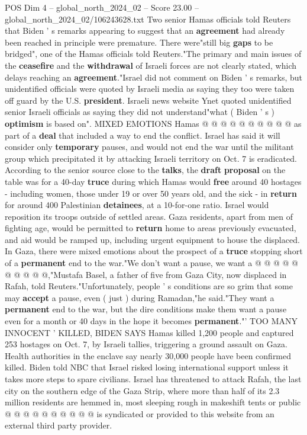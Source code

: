 \begin{textsample}{POS Dim 4 – global\_north\_2024\_02 – Score 23.00 – global\_north\_2024\_02/106243628.txt}
Two senior Hamas officials told Reuters that Biden ' s remarks appearing to suggest that an \textbf{agreement} had already been reached in principle were premature.
There were"still big \textbf{gaps} to be bridged", one of the Hamas officials told Reuters."The primary and main issues of the \textbf{ceasefire} and the \textbf{withdrawal} of Israeli forces are not clearly stated, which delays reaching an \textbf{agreement}."Israel did not comment on Biden ' s remarks, but unidentified officials were quoted by Israeli media as saying they too were taken off guard by the U.S. \textbf{president}.
Israeli news website Ynet quoted unidentified senior Israeli officials as saying they did not understand"what ( Biden ' s ) \textbf{optimism} is based on".
MIXED EMOTIONS Hamas @ @ @ @ @ @ @ @ @ @ as part of a \textbf{deal} that included a way to end the conflict.
Israel has said it will consider only \textbf{temporary} pauses, and would not end the war until the militant group which precipitated it by attacking Israeli territory on Oct. 7 is eradicated.
According to the senior source close to the \textbf{talks}, the \textbf{draft} \textbf{proposal} on the table was for a 40-day \textbf{truce} during which Hamas would \textbf{free} around 40 hostages - including women, those under 19 or over 50 years old, and the sick - in \textbf{return} for around 400 Palestinian \textbf{detainees}, at a 10-for-one ratio.
Israel would reposition its troops outside of settled areas.
Gaza residents, apart from men of fighting age, would be permitted to \textbf{return} home to areas previously evacuated, and aid would be ramped up, including urgent equipment to house the displaced.
In Gaza, there were mixed emotions about the prospect of a \textbf{truce} stopping short of a \textbf{permanent} end to the war."We don't want a pause, we want a @ @ @ @ @ @ @ @ @ @,"Mustafa Basel, a father of five from Gaza City, now displaced in Rafah, told Reuters."Unfortunately, people ' s conditions are so grim that some may \textbf{accept} a pause, even ( just ) during Ramadan,"he said."They want a \textbf{permanent} end to the war, but the dire conditions make them want a pause even for a month or 40 days in the hope it becomes \textbf{permanent}."' TOO MANY INNOCENT ' KILLED, BIDEN SAYS Hamas killed 1,200 people and captured 253 hostages on Oct. 7, by Israeli tallies, triggering a ground assault on Gaza.
Health authorities in the enclave say nearly 30,000 people have been confirmed killed.
Biden told NBC that Israel risked losing international support unless it takes more steps to spare civilians.
Israel has threatened to attack Rafah, the last city on the southern edge of the Gaza Strip, where more than half of its 2.3 million residents are hemmed in, most sleeping rough in makeshift tents or public @ @ @ @ @ @ @ @ @ @ is syndicated or provided to this website from an external third party provider.

\end{textsample}

